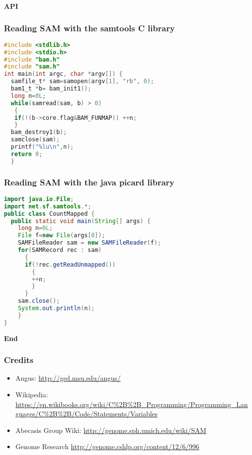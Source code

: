 \documentclass{beamer}
\newcommand{\centeredtitle}[1]{
\begin{center}
    \Huge{\bf{#1}}
\end{center}
}
\newcommand{\hugeslide}[1]{
\begin{frame}
\centeredtitle{#1}
\end{frame}
}
\begin{document}
\hugeslide{API}

\begin{frame}[fragile]
\frametitle{Reading SAM with the samtools C library}

\begin{lstlisting}[language=C]
#include <stdlib.h>
#include <stdio.h>
#include "bam.h"
#include "sam.h"
int main(int argc, char *argv[]) {
  samfile_t* sam=samopen(argv[1], "rb", 0);
  bam1_t *b= bam_init1();
  long n=0L;
  while(samread(sam, b) > 0)
   {
   if(!(b->core.flag&BAM_FUNMAP)) ++n;
   }
  bam_destroy1(b);
  samclose(sam);
  printf("%lu\n",n);
  return 0;
  }
\end{lstlisting}
\end{frame}



\begin{frame}[fragile]
\frametitle{Reading SAM with the java picard library}

\begin{lstlisting}[language=java]
import java.io.File;
import net.sf.samtools.*;
public class CountMapped {
  public static void main(String[] args) {
    long n=0L;
    File f=new File(args[0]);
    SAMFileReader sam = new SAMFileReader(f);
    for(SAMRecord rec : sam)
      {
      if(!rec.getReadUnmapped())
      	{
      	++n;
      	}
      }
    sam.close();
    System.out.println(n);
    }
}
\end{lstlisting}
\end{frame}


\hugeslide{End}


\begin{frame}[fragile]
\frametitle{Credits}
\begin{itemize}
\item Angus: \url{http://ged.msu.edu/angus/}
\item Wikipedia: \url{https://en.wikibooks.org/wiki/C%2B%2B_Programming/Programming_Languages/C%2B%2B/Code/Statements/Variables}
\item Abecasis Group Wiki: \url{http://genome.sph.umich.edu/wiki/SAM}
\item Genome Research \url{http://genome.cshlp.org/content/12/6/996}
\end{itemize}
\end{frame}
\end{document}
